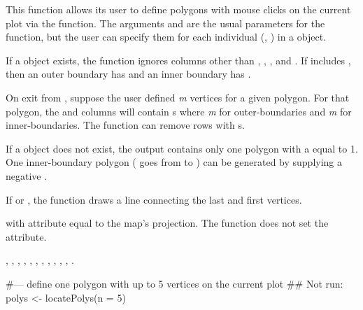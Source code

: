 \documentclass[letterpaper]{book}
\begin{document}
\begin{Details}\relax
This function allows its user to define polygons with mouse clicks on
the current plot via the  function.  The
arguments  and  are the usual parameters for the
 function, but the user can specify them for each
individual (, ) in a  object.

If a  object exists, the function ignores columns other
than , , , and .  If 
includes , then an outer boundary has  and an
inner boundary has .

On exit from , suppose the user defined \emph{m}
vertices for a given polygon. For that polygon, the  and
 columns will contain s where \emph{m} for outer-boundaries and \emph{m} for inner-boundaries.  The
 function can remove rows with s.

If a  object does not exist, the output contains only one
polygon with a  equal to 1.  One inner-boundary polygon
( goes from  to ) can be generated by
supplying a negative .

If  or , the function draws a line
connecting the last and first vertices.
\end{Details}
%
\begin{Value}
 with  attribute equal to the map's
projection.  The function does not set the  attribute.
\end{Value}
%
\begin{SeeAlso}\relax
{},
,
,
,
,
,
,
,
,
,
,
.
\end{SeeAlso}
%
\begin{Examples}
\begin{ExampleCode}
#--- define one polygon with up to 5 vertices on the current plot
## Not run: polys <- locatePolys(n = 5)
\end{ExampleCode}
\end{Examples}
\end{document}

